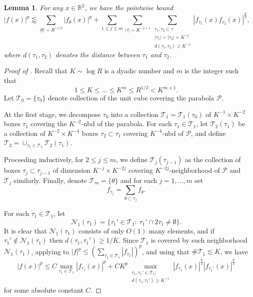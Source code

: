 \documentclass[10pt,a4paper]{amsart}
\newtheorem{lemma}{Lemma}
\newcommand{\R}{\mathbb{R}}
\newcommand{\les}{\lesssim}
\newcommand{\less}{\lessapprox}
\begin{document}
\begin{lemma}\label{ptwise bound}
For any $x\in \R^2$, we have the pointwise bound
\begin{equation}\label{eqn:iteration}
  |f(x)|^p \less \sum_{|\theta|=R^{-1/2}} |f_{\theta}(x)|^{p} + \sum_{1\leq j\leq m} \sum_{|\tau|=K^{-j+1}} \sum_{\substack{\tau_1,\tau_2\subset \tau \\ |\tau_1|=|\tau_2| = K^{-j}  \\ d(\tau_1,\tau_2)\geq   K^{-j}}} |f_{\tau_1}(x)f_{\tau_2}(x)|^{\frac p2},
\end{equation}
where $d(\tau_1,\tau_2)$ denotes the distance between $\tau_1$ and $\tau_2$. 
\end{lemma}

\begin{proof}[Proof of ]
Recall that $K\sim \log R$ is a dyadic number and $m$ is the integer such that 
\[1\le K\le \dots \le K^m \leq R^{1/2} < K^{m+1}.\]
Let $\mathcal T_0 =\{ \tau_0\}$ denote collection of the unit cube covering the parabola $\mathcal P$.

At the first stage, we decompose $\tau_0$ into a collection $\mathcal T_1=\mathcal T_1(\tau_0)$ of $K^{-1}\times K^{-2}$ boxes $\tau_1$ covering the $K^{-2}$-nbd of the parabola.
For each $\tau_1\in \mathcal T_1$,  let $\mathcal T_2(\tau_1)$ be a  collection of $K^{-2}\times K^{-4}$ boxes $\tau_2 \subset \tau_1$ covering $K^{-4}$-nbd of $\mathcal P$, and define $\mathcal T_2 = \cup_{\tau_1\in \mathcal T_1} \mathcal T_2(\tau_1)$.

Proceeding inductively, for $2\le j \le m$, we define $\mathcal T_j(\tau_{j-1})$ as the collection of boxes $\tau_j \subset \tau_{j-1}$ of dimension $K^{-j}\times K^{-2j}$ covering $K^{-2j}$-neighborhood of $\mathcal P$ and $\mathcal T_j$ similarly.
Finally, denote $\mathcal T_m=\{\theta\}$ and for each $j=1,\dots,m$ set
\[f_{\tau_j} = \sum_{\theta \subset \tau_j} f_\theta.\]


For each $\tau_1\in \mathcal T_1$, let 
\[
\mathcal N_1(\tau_1)=\{\tau_1'\in \mathcal T_1:~ \tau_1' \cap 2\tau_1 \neq \emptyset\}.
\]
It is clear that $\mathcal N_1(\tau_1)$ consists of only $O(1)$ many elements, and if $\tau_1' \notin \mathcal N_1(\tau_1)$ then $d(\tau_1,\tau_1')\ge 1/K$.
Since $\mathcal T_1$ is covered by such neighborhood $\mathcal N_1(\tau_1)$,
applying  to $|f|^p\leq (\sum_{\tau_1\in \mathcal T_1} |f_{\tau_1}|)^p$, and using that $\# \mathcal T_1 \les K$, we have
 \[ |f(x)|^p 
 \leq C\max_{\tau_1 \in \mathcal T_1} |f_{\tau_1}(x)|^p + CK^p \max_{\substack{\tau_1,\tau_1' \in \mathcal T_1; \\ d(\tau_1,\tau_1')\ge K^{-1} }} |f_{\tau_1}(x)|^{\frac p2} |f_{\tau_1'}(x)|^{\frac p2}   \]
for some absolute constant $C$.


\end{proof}
\end{document}
